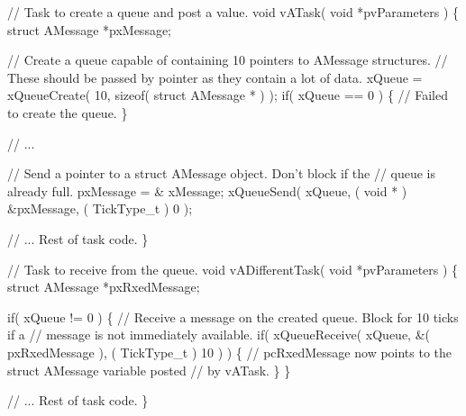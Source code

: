 \begin{DoxyPre}// Task to create a queue and post a value.
void vATask( void *pvParameters )
\{
struct AMessage *pxMessage;\end{DoxyPre}



\begin{DoxyPre}   // Create a queue capable of containing 10 pointers to AMessage structures.
   // These should be passed by pointer as they contain a lot of data.
   xQueue = xQueueCreate( 10, sizeof( struct AMessage * ) );
   if( xQueue == 0 )
   \{
    // Failed to create the queue.
   \}\end{DoxyPre}



\begin{DoxyPre}   // ...\end{DoxyPre}



\begin{DoxyPre}   // Send a pointer to a struct AMessage object.  Don't block if the
   // queue is already full.
   pxMessage = \& xMessage;
   xQueueSend( xQueue, ( void * ) \&pxMessage, ( TickType\_t ) 0 );\end{DoxyPre}



\begin{DoxyPre}   // ... Rest of task code.
\}\end{DoxyPre}



\begin{DoxyPre}// Task to receive from the queue.
void vADifferentTask( void *pvParameters )
\{
struct AMessage *pxRxedMessage;\end{DoxyPre}



\begin{DoxyPre}   if( xQueue != 0 )
   \{
    // Receive a message on the created queue.  Block for 10 ticks if a
    // message is not immediately available.
    if( xQueueReceive( xQueue, \&( pxRxedMessage ), ( TickType\_t ) 10 ) )
    \{
        // pcRxedMessage now points to the struct AMessage variable posted
        // by vATask.
    \}
   \}\end{DoxyPre}



\begin{DoxyPre}   // ... Rest of task code.
\}
\end{DoxyPre}
 